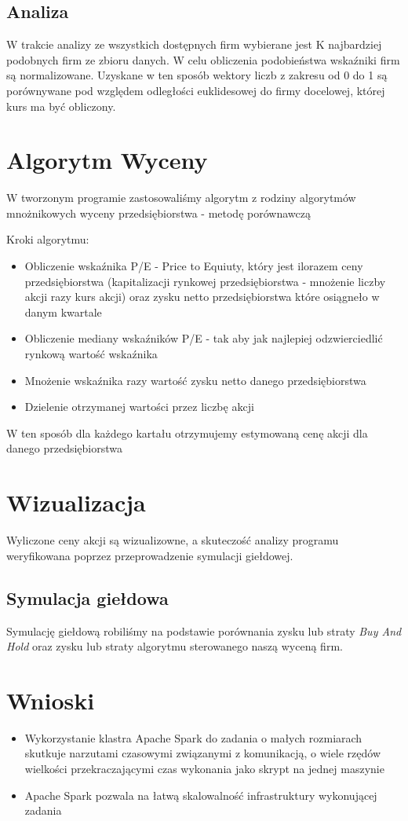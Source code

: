 \subsection{Analiza}
W trakcie analizy ze wszystkich dostępnych firm wybierane jest K najbardziej podobnych
firm ze zbioru danych.
W celu obliczenia podobieństwa wskaźniki firm są normalizowane.
Uzyskane w ten sposób wektory liczb z zakresu od 0 do 1 są porównywane pod względem
odległości euklidesowej do firmy docelowej, której kurs ma być obliczony.
\section{Algorytm Wyceny}
W tworzonym programie zastosowaliśmy algorytm z rodziny algorytmów mnożnikowych wyceny przedsiębiorstwa - metodę porównawczą

Kroki algorytmu:
\begin{itemize}
	\item Obliczenie wskaźnika P/E - Price to Equiuty, który jest ilorazem ceny przedsiębiorstwa (kapitalizacji rynkowej przedsiębiorstwa - mnożenie liczby akcji razy kurs akcji) oraz zysku netto przedsiębiorstwa które osiągneło w danym kwartale
	\item Obliczenie mediany wskaźników P/E - tak aby jak najlepiej odzwierciedlić rynkową wartość wskaźnika
	\item Mnożenie wskaźnika razy wartość zysku netto danego przedsiębiorstwa
	\item Dzielenie otrzymanej wartości przez liczbę akcji
\end{itemize}
W ten sposób dla każdego kartału otrzymujemy estymowaną cenę akcji dla danego przedsiębiorstwa
\section{Wizualizacja}
Wyliczone ceny akcji są wizualizowne, a skuteczość analizy programu weryfikowana poprzez
przeprowadzenie symulacji giełdowej.

\subsection{Symulacja giełdowa}
Symulację giełdową robiliśmy na podstawie porównania zysku lub straty \textit{Buy And Hold} oraz zysku lub straty algorytmu sterowanego naszą wyceną firm. 
\section{Wnioski}
\begin{itemize}
	\item Wykorzystanie klastra Apache Spark do zadania o
	małych rozmiarach skutkuje narzutami czasowymi związanymi z komunikacją,
	o wiele rzędów wielkości przekraczającymi czas wykonania jako skrypt na jednej maszynie
	\item Apache Spark pozwala na łatwą skalowalność infrastruktury wykonującej zadania
\end{itemize}

